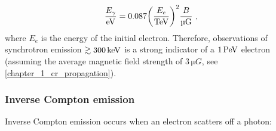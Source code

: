 \begin{equation}
    \begin{aligned}
    \frac{E_\gamma}{\eV}&=0.087 \qty(\frac{E_e}{\TeV})^2 \frac{B}{\si{\micro G}}\text{ ,}
    \end{aligned}
\end{equation}
\noindent where $E_e$ is the energy of the initial electron. Therefore, observations of synchrotron emission $\gtrsim 300\,\si{\kilo\electronvolt}$ is a strong indicator of a $1\,\PeV$ electron (assuming the average magnetic field strength of $3\,\si{\micro G}$, see \autoref{chapter_1_cr_propagation}).

\subsubsection{Inverse Compton emission}

Inverse Compton emission occurs when an electron scatters off a photon:

